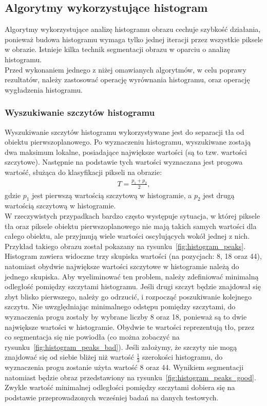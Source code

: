 \subsection{Algorytmy wykorzystujące histogram}
Algorytmy wykorzystujące analizę histogramu obrazu cechuje szybkość działania, ponieważ budowa histogramu wymaga tylko jednej iteracji przez wszystkie piksele w obrazie. Istnieje kilka technik segmentacji obrazu w oparciu o analizę histogramu. \\
Przed wykonaniem jednego z niżej omawianych algorytmów, w celu poprawy rezultatów, należy zastosować operację wyrównania histogramu, oraz operację wygładzenia histogramu.

\subsubsection{Wyszukiwanie szczytów histogramu}
Wyszukiwanie szczytów histogramu wykorzystywane jest do separacji tła od obiektu pierwszoplanowego. Po wyznaczeniu histogramu, wyszukiwane zostają dwa maksimum lokalne, posiadające największe wartości (są to tzw. wartości szczytowe). Następnie na podstawie tych wartości wyznaczana jest progowa wartość, służąca do klasyfikacji pikseli na obrazie:
\begin{gather*}
  T = \frac{p_1 + p_2}{2},
\end{gather*}
gdzie $p_1$ jest pierwszą wartością szczytową w histogramie, a $p_2$ jest drugą wartością szczytową w histogramie. \\
W rzeczywistych przypadkach bardzo często występuje sytuacja, w której piksele tła oraz piksele obiektu pierwszoplanowego nie mają takich samych wartości dla całego obiektu, ale przyjmują wiele wartości oscylujących wokół jednej z nich. Przykład takiego obrazu został pokazany na rysunku~\ref{fig:histogram_peaks}. Histogram zawiera widoczne trzy skupiska wartości (na pozycjach: 8, 18 oraz 44), natomiast obydwie największe wartości szczytowe w histogramie należą do jednego skupiska. Aby wyeliminować ten problem, należy zdefiniować minimalną odległość pomiędzy szczytami histogramu. Jeśli drugi szczyt będzie znajdował się zbyt blisko pierwszego, należy go odrzucić, i rozpocząć poszukiwanie kolejnego szczytu. Nie uwzględniając minimalnego odstępu pomiędzy szczytami, do wyznaczenia progu zostały by wybrane liczby 8 oraz 18, ponieważ są to dwie największe wartości w histogramie. Obydwie te wartości reprezentują tło, przez co segmentacja się nie powiodła (co można zobaczyć na rysunku~\ref{fig:histogram_peaks_bad}). Jeśli założymy, że szczyty nie mogą znajdować się od siebie bliżej niż wartość $\frac{1}{3}$ szerokości histogramu, do wyznaczenia progu zostanie użyta wartość 8 oraz 44. Wynikiem segmentacji natomiast będzie obraz przedstawiony na rysunku~\ref{fig:histogram_peaks_good}. Zwykle wartość minimalnej odległości pomiędzy szczytami dobiera się na podstawie przeprowadzonych wcześniej badań na danych testowych.

